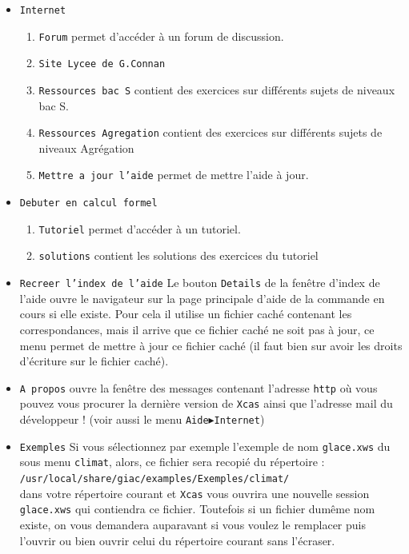 \documentclass[a4paper,11pt]{article}
\begin{document}
\begin{itemize}
\item
{\tt Internet}
\begin{enumerate}
\item
{\tt Forum} permet d'acc\'eder \`a un forum de discussion.
\item
{\tt Site Lycee de G.Connan} 
\item {\tt Ressources bac S}
contient des exercices sur diff\'erents sujets de  niveaux bac S.
\item {\tt Ressources Agregation}
contient des exercices sur diff\'erents sujets de  niveaux Agr\'egation
\item
{\tt Mettre a jour l'aide}
permet de mettre l'aide \`a jour.
\end{enumerate}
\item
{\tt Debuter en calcul formel}
\begin{enumerate}
\item
{\tt Tutoriel} permet d'acc\'eder \`a un tutoriel.
\item
{\tt solutions}
contient les solutions des exercices du tutoriel
\end{enumerate}
\item
{\tt Recreer l'index de l'aide}
Le bouton {\tt Details} de la fen\^etre d'index de l'aide ouvre le navigateur
sur la page principale d'aide de la commande en cours si elle
existe. Pour cela il utilise un fichier cach\'e contenant les
correspondances, mais il arrive que ce fichier cach\'e ne soit pas
\`a jour, ce menu permet de mettre \`a jour ce fichier cach\'e (il faut
bien sur avoir les droits d'\'ecriture sur le fichier cach\'e).
\item
{\tt A propos} ouvre la fen\^etre des messages contenant l'adresse {\tt http} 
o\`u vous pouvez vous procurer la derni\`ere version de {\tt Xcas} ainsi que 
l'adresse mail du d\'eveloppeur ! (voir aussi le menu 
{\tt Aide$\blacktriangleright$Internet})
\item 
{\tt Exemples}
Si vous s\'electionnez par exemple l'exemple de nom {\tt glace.xws} du sous 
menu {\tt climat}, alors, 
ce fichier sera recopi\'e du r\'epertoire :\\
{\tt /usr/local/share/giac/examples/Exemples/climat/}\\
dans votre r\'epertoire courant et {\tt Xcas} vous ouvrira 
une nouvelle session {\tt glace.xws} qui contiendra ce fichier. Toutefois si 
un fichier dum\^eme nom existe, on vous demandera auparavant si vous voulez
le remplacer puis l'ouvrir ou bien ouvrir celui du r\'epertoire courant sans 
l'\'ecraser.
\end{itemize}
\end{document}
